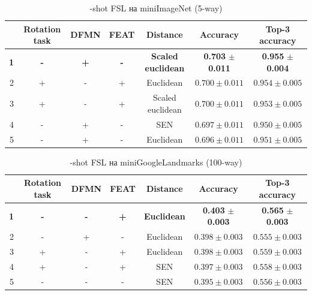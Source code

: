 \documentclass[a4paper, 12pt]{report}
\begin{document}
\begin{table}[H]
\begin{adjustbox}{center}
\begin{tabular}{| r | c c c c | c |  c | }
\hline
    & Rotation task   & DFMN   & FEAT   & Distance         & Accuracy         & Top-3 accuracy   \\
    \hline
  \textbf{1} & \textbf{-} & \textbf{+} & \textbf{-} & \textbf{Scaled} \textbf{euclidean} & \textbf{0.703} $\pm$ \textbf{0.011} & \textbf{0.955} $\pm$ \textbf{0.004} \\
    \hline
  2 & +               & -      & +      & Euclidean        & $0.700 \pm 0.011$ & $0.954 \pm 0.005$ \\
    \hline
  3 & +               & -      & +      & Scaled euclidean & $0.700 \pm 0.011$ & $0.953 \pm 0.005$ \\
    \hline
  4 & -               & +      & -      & SEN              & $0.697 \pm 0.011$ & $0.950 \pm 0.005$ \\
    \hline
  5 & -               & +      & -      & Euclidean        & $0.696 \pm 0.011$ & $0.951 \pm 0.005$ \\
\hline
\end{tabular}
\end{adjustbox}
\caption{-shot FSL на miniImageNet (5-way)}
\end{table}
 
  \begin{table}[H]
\begin{adjustbox}{center}
\begin{tabular}{| r | c c c c | c |  c | }
\hline
    & Rotation task   & DFMN   & FEAT   & Distance         & Accuracy         & Top-3 accuracy   \\
    \hline
  \textbf{1} & \textbf{-} & \textbf{-} & \textbf{+} & \textbf{Euclidean} & \textbf{0.403} $\pm$ \textbf{0.003} & \textbf{0.565} $\pm$ \textbf{0.003} \\
    \hline
  2 & -               & +      & -      & Euclidean        & $0.398 \pm 0.003$ & $0.555 \pm 0.003$ \\
    \hline
  3 & +               & -      & +      & Euclidean        & $0.398 \pm 0.003$ & $0.559 \pm 0.003$ \\
    \hline
  4 & +               & -      & +      & SEN              & $0.397 \pm 0.003$ & $0.558 \pm 0.003$ \\
    \hline
  5 & -               & -      & -      & SEN              & $0.395 \pm 0.003$ & $0.556 \pm 0.003$ \\
\hline
\end{tabular}
\end{adjustbox}
\caption{-shot FSL на miniGoogleLandmarks (100-way)}
\end{table}
 
\end{document}
